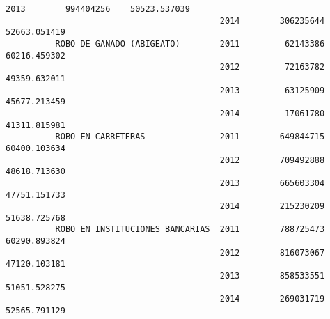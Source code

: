 \documentclass[11pt]{article}
\begin{document}
\begin{Verbatim}[commandchars=\\\{\}]
                                           2013        994404256    50523.537039   
                                           2014        306235644    52663.051419   
          ROBO DE GANADO (ABIGEATO)        2011         62143386    60216.459302   
                                           2012         72163782    49359.632011   
                                           2013         63125909    45677.213459   
                                           2014         17061780    41311.815981   
          ROBO EN CARRETERAS               2011        649844715    60400.103634   
                                           2012        709492888    48618.713630   
                                           2013        665603304    47751.151733   
                                           2014        215230209    51638.725768   
          ROBO EN INSTITUCIONES BANCARIAS  2011        788725473    60290.893824   
                                           2012        816073067    47120.103181   
                                           2013        858533551    51051.528275   
                                           2014        269031719    52565.791129   
          

\end{Verbatim}
\end{document}

